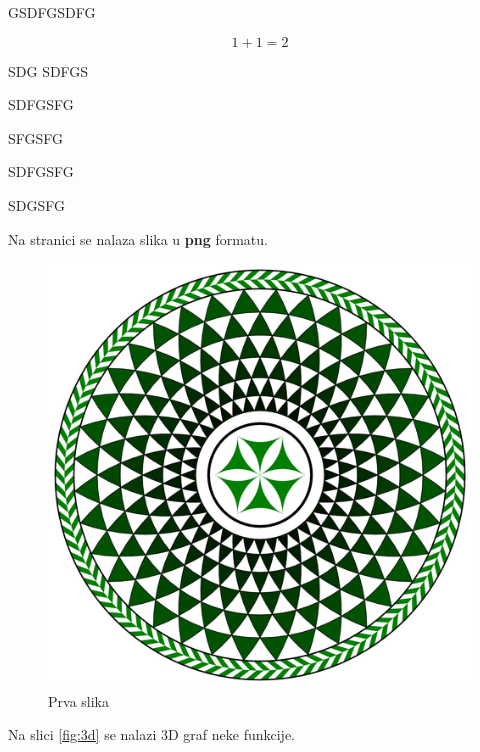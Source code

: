 \documentclass[a4paper,twoside,12pt]{memoir} %
\begin{document}
GSDFGSDFG



\begin{equation}
\label{eq:jed111}
	1+1=2
\end{equation}

SDG
SDFGS

SDFGSFG


SFGSFG


SDFGSFG


SDGSFG

\label{stranica}
Na stranici \pageref{stranica} se nalaza slika u \textbf{png} formatu.
\begin{figure}[h!t]
\begin{center}
\includegraphics[scale=0.5]{mosaic-from-pompeii.png}
\caption{Prva slika}
\end{center}
\end{figure}

Na slici \ref{fig:3d} se nalazi 3D graf neke funkcije. 
\end{document}

